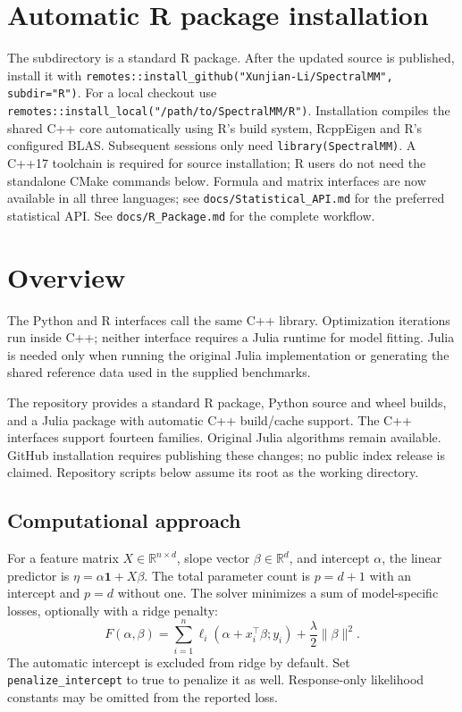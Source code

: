 \documentclass[11pt,a4paper]{article}
\newcommand{\code}[1]{\texttt{#1}}
\begin{document}
\section*{Automatic R package installation}
The  subdirectory is a standard R package. After the updated source is
published, install it with \texttt{remotes::install\_github("Xunjian-Li/SpectralMM", subdir="R")}.
For a local checkout use \texttt{remotes::install\_local("/path/to/SpectralMM/R")}.
Installation compiles the shared C++ core automatically using R's build system,
RcppEigen and R's configured BLAS. Subsequent sessions only need
\texttt{library(SpectralMM)}. A C++17 toolchain is required for source installation;
R users do not need the standalone CMake commands below. Formula and matrix interfaces are now available in all three languages; see
\texttt{docs/Statistical\_API.md} for the preferred statistical API. See \texttt{docs/R\_Package.md} for the complete workflow.

\section{Overview}
The Python and R interfaces call the same C++ library. Optimization iterations
run inside C++; neither interface requires a Julia runtime for model fitting.
Julia is needed only when running the original Julia implementation or generating
the shared reference data used in the supplied benchmarks.

The repository provides a standard R package, Python source and wheel builds,
and a Julia package with automatic C++ build/cache support. The C++ interfaces
support fourteen families. Original Julia algorithms remain available.
GitHub installation requires publishing these changes; no public index release
is claimed. Repository scripts below assume its root as the working directory.

\subsection{Computational approach}
For a feature matrix $X\in\mathbb{R}^{n\times d}$, slope vector
$\beta\in\mathbb{R}^{d}$, and intercept $\alpha$, the linear predictor is
$\eta=\alpha\mathbf{1}+X\beta$. The total parameter count is $p=d+1$
with an intercept and $p=d$ without one.
The solver minimizes a sum of model-specific losses, optionally with a ridge penalty:
\[
 F(\alpha,\beta)=\sum_{i=1}^{n}\ell_i(\alpha+x_i^\top\beta;y_i)
       +\frac{\lambda}{2}\|\beta\|^2.
\]
The automatic intercept is excluded from ridge by default. Set
\code{penalize\_intercept} to true to penalize it as well. Response-only
likelihood constants may be omitted from the reported loss.
\end{document}
